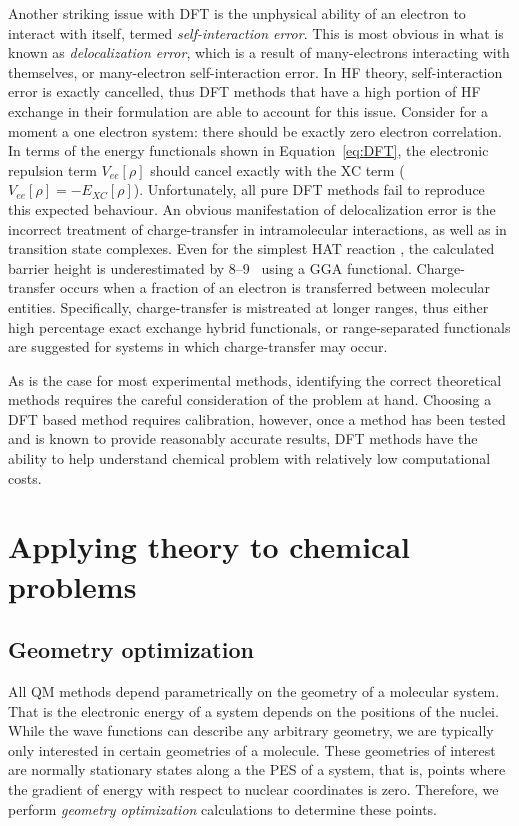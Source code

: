 Another striking issue with DFT is the unphysical ability of an electron to
interact with itself, termed \emph{self-interaction error}. This is most
obvious in what is known as \emph{delocalization error}, which is a result of
many-electrons interacting with themselves, or many-electron self-interaction
error. In HF theory, self-interaction error is exactly cancelled, thus DFT
methods that have a high portion of HF exchange in their formulation are able
to account for this issue. Consider for a moment a one electron system: there
should be exactly zero electron correlation. In terms of the energy functionals
shown in Equation~\ref{eq:DFT}, the electronic repulsion term $V_{ee}[\rho]$
should cancel exactly with the XC term ($V_{ee}[\rho] =
-E_{XC}[\rho]$).\cite{Cramer2004} Unfortunately, all pure DFT methods fail to
reproduce this expected behaviour. An obvious manifestation of delocalization
error is the incorrect treatment of charge-transfer in intramolecular
interactions,\cite{MoriSanchez2008,OterodelaRoza2014} as well as in transition
state complexes. Even for the simplest HAT reaction ,
the calculated barrier height is underestimated by 8--9 \kcalmol\ using a GGA
functional.\cite{Csonka1998} Charge-transfer occurs when a fraction of an
electron is transferred between molecular entities. Specifically,
charge-transfer is mistreated at longer ranges, thus either high percentage
exact exchange hybrid functionals, or range-separated functionals are suggested
for systems in which charge-transfer may occur.

As is the case for most experimental methods, identifying the correct
theoretical methods requires the careful consideration of the problem at hand.
Choosing a DFT based method requires calibration, however, once a method has
been tested and is known to provide reasonably accurate results, DFT methods
have the ability to help understand chemical problem with relatively low
computational costs.

\section{Applying theory to chemical problems}

\subsection{Geometry optimization}

All QM methods depend parametrically on the geometry of a molecular system. That
is the electronic energy of a system depends on the positions of the nuclei.
While the wave functions can describe any arbitrary geometry, we are typically
only interested in certain geometries of a molecule. These geometries of
interest are normally stationary states along a the PES of a system, that is,
points where the gradient of energy with respect to nuclear coordinates is zero.
Therefore, we perform \emph{geometry optimization} calculations to determine
these points.

